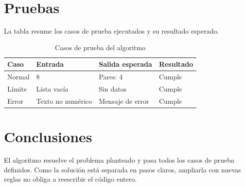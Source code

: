 \documentclass[12pt]{article}
\begin{document}
  \section{Pruebas}
  La tabla resume los casos de prueba ejecutados y su resultado esperado.

  \begin{table}[H]
    \centering
    \caption{Casos de prueba del algoritmo}
    \begin{tabular}{@{}llll@{}}
      \toprule
      Caso & Entrada & Salida esperada & Resultado \\
      \midrule
      Normal & 8 & Pares: 4 & Cumple \\
      Límite & Lista vacía & Sin datos & Cumple \\
      Error & Texto no numérico & Mensaje de error & Cumple \\
      \bottomrule
    \end{tabular}
  \end{table}

  \section{Conclusiones}
  El algoritmo resuelve el problema planteado y pasa todos los casos de
  prueba definidos. Como la solución está separada en pasos claros,
  ampliarla con nuevas reglas no obliga a reescribir el código entero.
\end{document}

